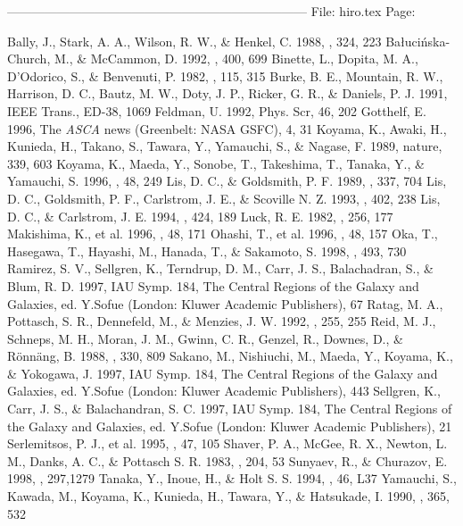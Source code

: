 {{{{{{{{{{{{{{\begin{references}




\end{references}
------------------------------------------------------------------------
File: hiro.tex
Page:		 \setcounter{page}{586}
\begin{references}
 Bally, J., Stark, A. A., Wilson, R. W., \& Henkel,
C. 1988, \apj, 324, 223
 Ba\l uci\'{n}ska-Church, M., \& McCammon, D. 1992, \apj,
400, 699
 Binette, L., Dopita, M. A., D'Odorico, S., \&
Benvenuti, P. 1982, \aap, 115, 315
 Burke, B. E., Mountain, R. W., Harrison, D. C.,
Bautz, M. W., Doty, J. P., Ricker, G. R., \& Daniels, P. J. 1991, IEEE
Trans., ED-38, 1069
 Feldman, U. 1992, Phys. Scr, 46, 202
Gotthelf, E. 1996, The {{\em ASCA}} news (Greenbelt: NASA GSFC), 4, 31
 Koyama, K., Awaki, H., Kunieda, H., Takano,
S., Tawara, Y., Yamauchi, S., \& Nagase, F. 1989, nature, 339, 603
 Koyama, K., Maeda, Y., Sonobe, T., Takeshima, T.,
Tanaka, Y., \& Yamauchi, S. 1996, \pasj, 48, 249
 Lis, D. C., \& Goldsmith, P. F. 1989, \apj, 337, 704
 Lis, D. C., Goldsmith, P. F., Carlstrom, J. E., \&
Scoville N. Z. 1993, \apj, 402, 238
 Lis, D. C., \& Carlstrom, J. E. 1994, \apj, 424, 189
 Luck, R. E. 1982, \apj, 256, 177
Makishima, K., et al. 1996, \pasj, 48, 171
Ohashi, T., et al. 1996, \pasj, 48, 157
 Oka, T., Hasegawa, T., Hayashi, M., Hanada, T., \&
Sakamoto, S. 1998, \apj, 493, 730
 Ramirez, S. V., Sellgren, K., Terndrup, D. M.,
Carr, J. S., Balachadran, S., \& Blum, R. D. 1997, IAU
 Symp. 184, The Central Regions of the Galaxy and Galaxies,
 ed. Y.Sofue (London: Kluwer Academic Publishers), 67
 Ratag, M. A., Pottasch, S. R., Dennefeld,
 M., \& Menzies, J. W. 1992, \aap, 255, 255
 Reid, M. J., Schneps, M. H., Moran, J. M., Gwinn,
C. R., Genzel, R., Downes, D., \& R\"{o}nn\"{a}ng, B. 1988, \apj, 330,
809
 Sakano, M., Nishiuchi, M., Maeda, Y., Koyama,
K., \& Yokogawa, J. 1997, IAU
 Symp. 184, The Central Regions of the Galaxy and Galaxies,
 ed. Y.Sofue (London: Kluwer Academic Publishers), 443
 Sellgren, K., Carr, J. S., \& Balachandran,
S. C. 1997, IAU Symp. 184, The Central Regions of the Galaxy and
Galaxies, ed. Y.Sofue (London: Kluwer Academic Publishers), 21
Serlemitsos, P. J., et al. 1995, \pasj, 47, 105
 Shaver, P. A., McGee, R. X., Newton, L. M., Danks,
A. C., \& Pottasch S. R. 1983, \mnras, 204, 53
 Sunyaev, R., \& Churazov, E. 1998, \mnras, 297,1279
Tanaka, Y., Inoue, H., \& Holt S. S. 1994, \pasj, 46, L37
 Yamauchi, S., Kawada, M., Koyama, K., Kunieda,
H., Tawara, Y., \& Hatsukade, I. 1990, \apj, 365, 532


\end{references}}}}}}}}}}}}}}}
